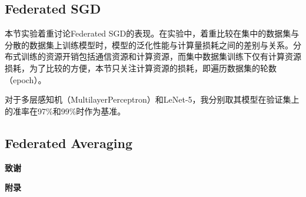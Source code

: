 \documentclass[zihao = -4,cn]{oucart}
\begin{document}
\subsection{Federated SGD}
本节实验着重讨论Federated SGD的表现。在实验中，着重比较在集中的数据集与分散的数据集上训练模型时，模型的泛化性能与计算量损耗之间的差别与关系。分布式训练的资源开销包括通信资源和计算资源，而集中数据集训练下仅有计算资源损耗，为了比较的方便，本节只关注计算资源的损耗，即遍历数据集的轮数（epoch）。\par
对于多层感知机（MultilayerPerceptron）和LeNet-5，我分别取其模型在验证集上的准率在97\%和99\%时作为基准。
\subsection{Federated Averaging}



\newpage
%


\newpage
\begin{center}
 \textbf{致谢} \\
\end{center}

\newpage
\begin{center}
 \textbf{附录} \\


\end{center}
\end{document}
